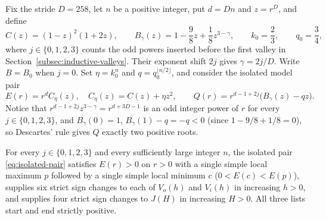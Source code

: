 Fix the stride $D=258$, let $n$ be a positive integer, put $d=Dn$ and $z=r^D$, and define
\begin{equation}\label{eq:valley-shapes}
  C(z) = (1-z)^2(1+2z), \qquad B_\gamma(z) = 1 - \frac{9}{8}z + \frac{1}{8}z^{3-\gamma}, \qquad k_0 =
  \frac{2}{3}, \qquad q_0 = \frac{3}{4},
\end{equation}
where $j\in\{0,1,2,3\}$ counts the odd powers inserted before the
first valley in Section~\ref{subsec:inductive-valleys}. Their exponent
shift $2j$ gives $\gamma=2j/D$. Write $B=B_0$ when $j=0$. Set $\eta=k_0^n$ and
$q=q_0^{\lfloor n/2\rfloor}$, and consider the isolated model pair
\begin{equation}\label{eq:isolated-pair}
  E(r) = r^d C_\eta(z), \quad C_\eta(z) = C(z) + \eta z^2, \qquad Q(r) = r^{d-1+2j}\bigl(B_\gamma(z) - qz\bigr).
\end{equation}
Notice that $r^{d-1+2j}z^{3-\gamma}=r^{d+3D-1}$ is an odd integer power of $r$ for every
$j\in\{0,1,2,3\}$, and $B_\gamma(0)=1$, $B_\gamma(1)-q=-q<0$ (since $1-9/8+1/8=0$), so Descartes' rule
gives $Q$ exactly two positive roots.

\begin{lemma}\label{lem:valley-local}
For every $j\in\{0,1,2,3\}$ and every sufficiently large integer $n$, the isolated pair
\eqref{eq:isolated-pair} satisfies $E(r)>0$ on $r>0$ with a single simple local maximum $p$ followed
by a single simple local minimum $c$ ($0<E(c)<E(p)$), supplies six strict sign changes to each of
$V_o(h)$ and $V_i(h)$ in increasing $h>0$, and supplies four strict sign changes to $J(H)$ in
increasing $H>0$. All three lists start and end strictly positive.
\end{lemma}

